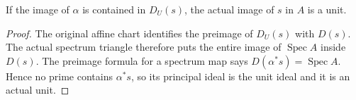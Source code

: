 \begin{lemma}\label{lem:sc0-affine-open-chart-principal-unit}
\leanok
{}
If the image of $\alpha$ is contained in $D_U(s)$, the actual image of $s$ in
$A$ is a unit.
\end{lemma}
\begin{proof}
The original affine chart identifies the preimage of $D_U(s)$ with $D(s)$.
The actual spectrum triangle therefore puts the entire image of
$\operatorname{Spec}A$ inside $D(s)$. The preimage formula for a spectrum map
says $D(\alpha^*s)=\operatorname{Spec}A$. Hence no prime contains
$\alpha^*s$, so its principal ideal is the unit ideal and it is an actual unit.
\end{proof}
